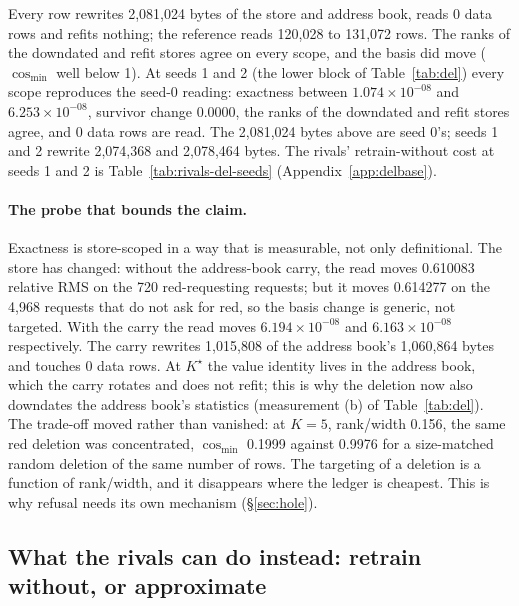 \documentclass{article} %
\newcommand{\sci}[2]{\ensuremath{#1\times10^{#2}}}
\newcommand{\Kstar}{\ensuremath{K^{\star}}}
\begin{document}
\noindent Every row rewrites 2,081,024 bytes of the store and address book, reads 0 data rows
and refits nothing; the reference reads 120,028 to 131,072 rows. %
The ranks of the downdated and refit stores agree on every scope, and the basis did move
($\cos_{\min}$ well below 1). %
At seeds 1 and 2 (the lower block of Table~\ref{tab:del}) every scope reproduces the seed-0
reading: exactness between \sci{1.074}{-08} and \sci{6.253}{-08}, survivor change 0.0000, the
ranks of the downdated and refit stores agree, and 0 data rows are read. The 2,081,024 bytes above
are seed 0's; seeds 1 and 2 rewrite 2,074,368 and 2,078,464 bytes. The rivals' retrain-without
cost at seeds 1 and 2 is Table~\ref{tab:rivals-del-seeds} (Appendix~\ref{app:delbase}).

\paragraph{The probe that bounds the claim.} Exactness is store-scoped in a way that is
measurable, not only definitional.
The store has changed: without the address-book carry, the read moves 0.610083 relative RMS on
the 720 red-requesting requests; but it moves 0.614277 on the 4,968 requests that do not ask
for red, so the basis change is generic, not targeted. With the carry the read moves
\sci{6.194}{-08} and \sci{6.163}{-08} respectively. The carry rewrites 1,015,808 of the
address book's 1,060,864 bytes and touches 0 data rows. %
At $\Kstar$ the value identity
lives in the address book, which the carry rotates and does not refit; this is why the deletion
now also downdates the address book's statistics (measurement (b) of Table~\ref{tab:del}). The trade-off moved
rather than vanished: at $K=5$, rank/width 0.156, the same red deletion was concentrated,
$\cos_{\min}$ 0.1999 against 0.9976 for a size-matched random deletion of the same number of
rows. %
The targeting of a deletion is a function of rank/width, and it disappears where the ledger is
cheapest. This is why refusal needs its own mechanism (\S\ref{sec:hole}).

\subsection{What the rivals can do instead: retrain without, or approximate}
\label{sec:del-comparators}
\end{document}
